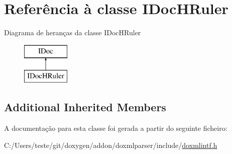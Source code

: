 \hypertarget{class_i_doc_h_ruler}{\section{Referência à classe I\-Doc\-H\-Ruler}
\label{class_i_doc_h_ruler}
}
Diagrama de heranças da classe I\-Doc\-H\-Ruler\begin{figure}[H]
\begin{center}
\leavevmode
\includegraphics[height=2.000000cm]{class_i_doc_h_ruler}
\end{center}
\end{figure}
\subsection*{Additional Inherited Members}


A documentação para esta classe foi gerada a partir do seguinte ficheiro\-:\begin{DoxyCompactItemize}
\item 
C\-:/\-Users/teste/git/doxygen/addon/doxmlparser/include/\hyperlink{include_2doxmlintf_8h}{doxmlintf.\-h}\end{DoxyCompactItemize}
